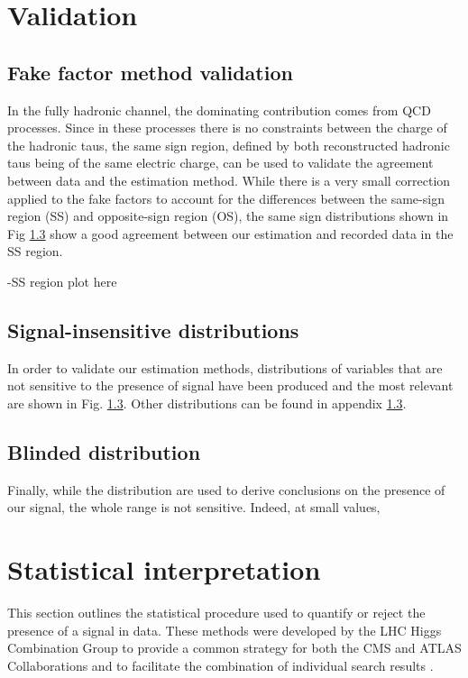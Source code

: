 \section{Validation}

\subsection{Fake factor method validation}

In the fully hadronic channel, the dominating contribution comes from QCD processes. Since in these processes there is no constraints between the charge of the hadronic taus, the same sign region, defined by both reconstructed hadronic taus being of the same electric charge, can be used to validate the agreement between data and the estimation method. While there is a very small correction applied to the fake factors to account for the differences between the same-sign region (SS) and  opposite-sign region (OS), the same sign distributions shown in Fig \ref{} show a good agreement between our estimation and recorded data in the SS region.

-SS region plot here

\subsection{Signal-insensitive distributions}

In order to validate our estimation methods, distributions of variables that are not sensitive to the presence of signal have been produced and the most relevant are shown in Fig. \ref{}. Other distributions can be found in appendix \ref{}.

\subsection{Blinded distribution}

Finally, while the \mttot distribution are used to derive conclusions on the presence of our signal, the whole range is not sensitive. Indeed, at small \mttot values, 

\section{Statistical interpretation}
\label{sec:analysis_statistical_interpretation}

This section outlines the statistical procedure used to quantify or reject the presence of a signal in data. These methods were developed by the LHC Higgs Combination Group to provide a common strategy for both the CMS and ATLAS Collaborations and to facilitate the combination of individual search results \cite{CMS-NOTE-2011-005}. 

